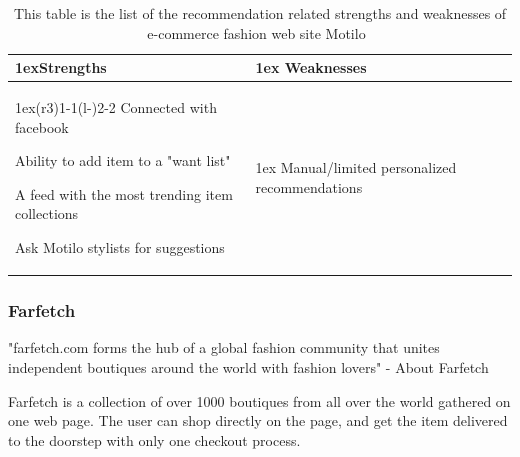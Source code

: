     \begin{table}[H]
    \centering
    \begin{tabularx}{\linewidth}{>{\parskip1ex}X@{\kern4\tabcolsep}>{\parskip1ex}X}
    	\toprule
    	\hfil\bfseries Strengths
    	&
    	\hfil\bfseries Weaknesses
    		\\\cmidrule(r{3\tabcolsep}){1-1}\cmidrule(l{-\tabcolsep}){2-2}
            Connected with facebook \par
            Ability to add item to a "want list" \par
            A feed with the most trending item collections \par
            Ask Motilo stylists for suggestions \par
            &
            Manual/limited personalized recommendations \par
            \\\bottomrule
            \end{tabularx}
            \caption[Recommendation related strengths and weaknesses of Motilo~\cite{motilo}]{This table is the list of the recommendation related strengths and weaknesses of e-commerce fashion web site Motilo~\cite{motilo}}
            \label{table:ecommenreceMotilo}
        \end{table}




\subsubsection{Farfetch} %
\label{par:farfetch}
    "farfetch.com forms the hub of a global fashion community that unites independent boutiques around the world with fashion lovers" - About Farfetch~\cite{Farfetch}

    Farfetch is a collection of over 1000 boutiques from all over the world gathered on one web page.
    The user can shop directly on the page, and get the item delivered to the doorstep with only one checkout process.


